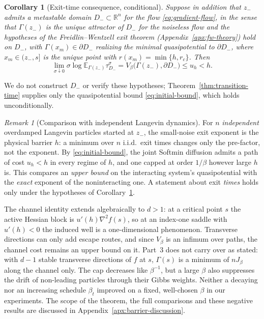 \documentclass{article} %
\theoremstyle{plain}
\newtheorem{corollary}[theorem]{Corollary}
\theoremstyle{definition}
\theoremstyle{remark}
\newtheorem{remark}[theorem]{Remark}
\newcommand{\R}{\mathbb{R}}
\newcommand{\E}{\mathbb{E}}
\begin{document}
\begin{corollary}[Exit-time consequence, conditional]
\label{cor:exit-time-conditional}
Suppose in addition that $z_-$ admits a metastable domain $D_-\subset\R^n$ for the flow \eqref{eq:gradient-flow}, in the sense that $\Gamma(z_-)$ is the unique attractor of $D_-$ for the noiseless flow and the hypotheses of the Freidlin--Wentzell exit theorem (Appendix~\ref{apx:fw-theory}) hold on $D_-$, with $\Gamma(x_m)\in\partial D_-$ realizing the minimal quasipotential to $\partial D_-$, where $x_m\in(z_-,s]$ is the unique point with $r(x_m)=\min\{h,r_c\}$. Then
\[
    \lim_{\sigma\downarrow0}\sigma\log \E_{\Gamma(z_-)}\tau_{D_-}^\sigma
    =V_\beta\bigl(\Gamma(z_-),\partial D_-\bigr)\le u_h<h.
\]
\end{corollary}
We do not construct $D_-$ or verify these hypotheses; Theorem~\ref{thm:transition-time} supplies only the quasipotential bound \eqref{eq:initial-bound}, which holds unconditionally.

\begin{remark}[Comparison with independent Langevin dynamics]
\label{rem:comparison}
For $n$ \emph{independent} overdamped Langevin particles started at $z_-$, the small-noise exit exponent is the physical barrier $h$: a minimum over $n$ i.i.d.\ exit times changes only the pre-factor, not the exponent. By \eqref{eq:initial-bound}, the joint Softmin diffusion admits a path of cost $u_h<h$ in every regime of $h$, and one capped at order $1/\beta$ however large $h$ is. This compares an \emph{upper bound} on the interacting system's quasipotential with the \emph{exact} exponent of the noninteracting one. A statement about exit \emph{times} holds only under the hypotheses of Corollary~\ref{cor:exit-time-conditional}.
\end{remark}

The channel identity extends algebraically to $d>1$: at a critical point $s$ the active Hessian block is $u'(h)\nabla^2 f(s)$, so at an index-one saddle with $u'(h)<0$ the induced well is a one-dimensional phenomenon. Transverse directions can only add escape routes, and since $V_\beta$ is an infimum over paths, the channel cost remains an upper bound on it. Part~3 does not carry over as stated: with $d-1$ stable transverse directions of $f$ at $s$, $\Gamma(s)$ is a minimum of $nJ_\beta$ along the channel only. The cap decreases like $\beta^{-1}$, but a large $\beta$ also suppresses the drift of non-leading particles through their Gibbs weights. Neither a decaying nor an increasing schedule $\beta_t$ improved on a fixed, well-chosen $\beta$ in our experiments. The scope of the theorem, the full comparisons and these negative results are discussed in Appendix~\ref{apx:barrier-discussion}.
\end{document}

